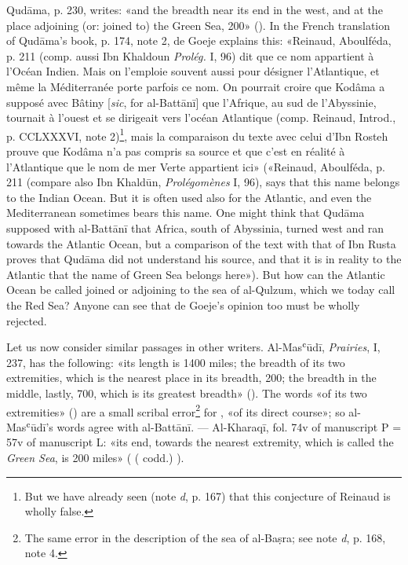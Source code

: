 \documentclass[11pt]{article}
\begin{document}
\par Qudāma, p. 230, writes: «and the breadth near its end in the west, and at the place adjoining (or: joined to) the Green Sea, 200» (). In the French translation of Qudāma's book, p. 174, note 2, de Goeje explains this: «Reinaud, Aboulféda, p. 211 (comp. aussi Ibn Khaldoun \emph{Prolég.} I, 96) dit que ce nom appartient à l’Océan Indien. Mais on l’emploie souvent aussi pour désigner l’Atlantique, et même la Méditerranée porte parfois ce nom. On pourrait croire que Kodâma a supposé avec Bâtiny [\emph{sic}, for al-Battānī] que l’Afrique, au sud de l’Abyssinie, tournait à l’ouest et se dirigeait vers l’océan Atlantique (comp. Reinaud, Introd., p. CCLXXXVI, note 2)\footnote{But we have already seen (note \emph{d}, p. 167) that this conjecture of Reinaud is wholly false.}, mais la comparaison du texte avec celui d’Ibn Rosteh prouve que Kodâma n’a pas compris sa source et que c’est en réalité à l’Atlantique que le nom de mer Verte appartient ici» («Reinaud, Aboulféda, p. 211 (compare also Ibn Khaldūn, \emph{Prolégomènes} I, 96), says that this name belongs to the Indian Ocean. But it is often used also for the Atlantic, and even the Mediterranean sometimes bears this name. One might think that Qudāma supposed with al-Battānī that Africa, south of Abyssinia, turned west and ran towards the Atlantic Ocean, but a comparison of the text with that of Ibn Rusta proves that Qudāma did not understand his source, and that it is in reality to the Atlantic that the name of Green Sea belongs here»). But how can the Atlantic Ocean be called joined or adjoining to the sea of al-Qulzum, which we today call the Red Sea? Anyone can see that de Goeje's opinion too must be wholly rejected.\par
\par Let us now consider similar passages in other writers. Al-Masʿūdī, \emph{Prairies}, I, 237, has the following: «its length is 1400 miles; the breadth of its two extremities, which is the nearest place in its breadth, 200; the breadth in the middle, lastly, 700, which is its greatest breadth» (). The words «of its two extremities» () are a small scribal error\footnote{The same error in the description of the sea of al-Baṣra; see note \emph{d}, p. 168, note 4.} for , «of its direct course»; so al-Masʿūdī's words agree with al-Battānī. — Al-Kharaqī, fol. 74v of manuscript P = 57v of manuscript L: «its end, towards the nearest extremity, which is called the \emph{Green Sea}, is 200 miles» ( ( codd.) ).\par
\end{document}
